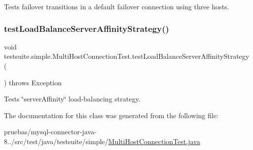 Tests failover transitions in a default failover connection using three hosts. \mbox{\label{classtestsuite_1_1simple_1_1_multi_host_connection_test_ae9514e6473a1fcd37fc3a964e107f271}} 
\subsubsection{\texorpdfstring{test\+Load\+Balance\+Server\+Affinity\+Strategy()}{testLoadBalanceServerAffinityStrategy()}}
{\footnotesize\ttfamily void testsuite.\+simple.\+Multi\+Host\+Connection\+Test.\+test\+Load\+Balance\+Server\+Affinity\+Strategy (\begin{DoxyParamCaption}{ }\end{DoxyParamCaption}) throws Exception}

Tests \char`\"{}server\+Affinity\char`\"{} load-\/balancing strategy. 

The documentation for this class was generated from the following file\+:\begin{DoxyCompactItemize}
\item 
pruebas/mysql-\/connector-\/java-\/8../src/test/java/testsuite/simple/\mbox{\hyperlink{_multi_host_connection_test_8java}{Multi\+Host\+Connection\+Test.\+java}}\end{DoxyCompactItemize}
